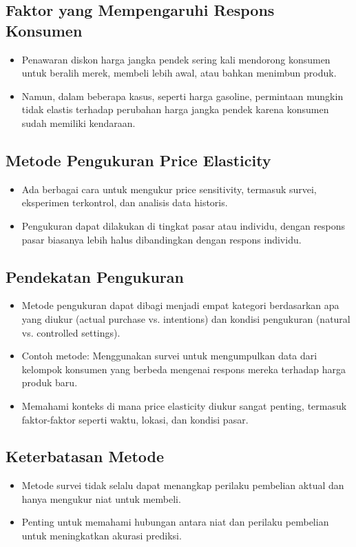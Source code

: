 \documentclass{article}
\begin{document}
\subsection{Faktor yang Mempengaruhi Respons Konsumen}
\begin{itemize}
    \item Penawaran diskon harga jangka pendek sering kali mendorong konsumen untuk beralih merek, membeli lebih awal, atau bahkan menimbun produk.
    \item Namun, dalam beberapa kasus, seperti harga gasoline, permintaan mungkin tidak elastis terhadap perubahan harga jangka pendek karena konsumen sudah memiliki kendaraan.
\end{itemize}

\subsection{Metode Pengukuran Price Elasticity}
\begin{itemize}
    \item Ada berbagai cara untuk mengukur price sensitivity, termasuk survei, eksperimen terkontrol, dan analisis data historis.
    \item Pengukuran dapat dilakukan di tingkat pasar atau individu, dengan respons pasar biasanya lebih halus dibandingkan dengan respons individu.
\end{itemize}

\subsection{Pendekatan Pengukuran}
\begin{itemize}
    \item Metode pengukuran dapat dibagi menjadi empat kategori berdasarkan apa yang diukur (actual purchase vs. intentions) dan kondisi pengukuran (natural vs. controlled settings).
    \item Contoh metode: Menggunakan survei untuk mengumpulkan data dari kelompok konsumen yang berbeda mengenai respons mereka terhadap harga produk baru.
    \item Memahami konteks di mana price elasticity diukur sangat penting, termasuk faktor-faktor seperti waktu, lokasi, dan kondisi pasar.
\end{itemize}

\subsection{Keterbatasan Metode}
\begin{itemize}
    \item Metode survei tidak selalu dapat menangkap perilaku pembelian aktual dan hanya mengukur niat untuk membeli.
    \item Penting untuk memahami hubungan antara niat dan perilaku pembelian untuk meningkatkan akurasi prediksi.
\end{itemize}
\end{document}
